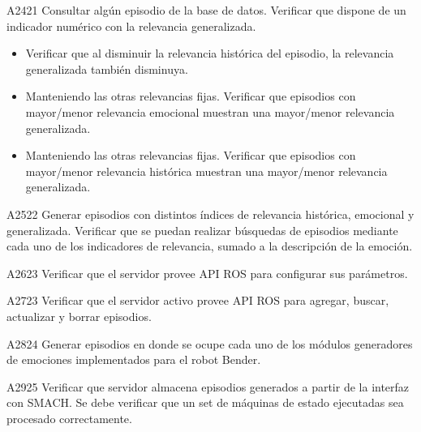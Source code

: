 \begin{def-validacion}{A}{24}{21}
	Consultar algún episodio de la base de datos. Verificar que dispone de un indicador numérico con la relevancia generalizada.
	\begin{itemize}
		\item Verificar que al disminuir la relevancia histórica del episodio, la relevancia generalizada también disminuya.
		\item Manteniendo las otras relevancias fijas. Verificar que episodios con mayor/menor relevancia emocional muestran una mayor/menor relevancia generalizada.
		\item Manteniendo las otras relevancias fijas. Verificar que episodios con mayor/menor relevancia histórica muestran una mayor/menor relevancia generalizada.
	\end{itemize}	
\end{def-validacion}

\begin{def-validacion}{A}{25}{22}
	Generar episodios con distintos índices de relevancia histórica, emocional y generalizada. Verificar que se puedan realizar búsquedas de episodios mediante cada uno de los indicadores de relevancia, sumado a la descripción de la emoción.	
\end{def-validacion}

\begin{def-validacion}{A}{26}{23}
Verificar que el servidor provee API ROS para configurar sus parámetros.	
\end{def-validacion}

\begin{def-validacion}{A}{27}{23}
Verificar que el servidor activo provee API ROS para agregar, buscar, actualizar y borrar episodios. 	
\end{def-validacion}

\begin{def-validacion}{A}{28}{24}
	Generar episodios en donde se ocupe cada uno de los módulos generadores de emociones implementados para el robot Bender.
\end{def-validacion}

\begin{def-validacion}{A}{29}{25}
Verificar que servidor almacena episodios generados a partir de la interfaz con SMACH. Se debe verificar que un set de máquinas de estado ejecutadas sea procesado correctamente.	
\end{def-validacion}



